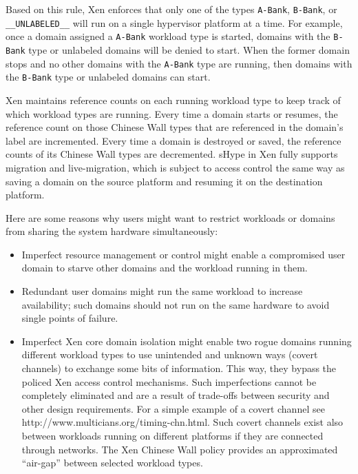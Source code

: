 \documentclass[11pt,twoside,final,openright]{report}
\begin{document}
Based on this rule, Xen enforces that only one of the types
\verb|A-Bank|, \verb|B-Bank|, or \verb|__UNLABELED__| will run
on a single hypervisor platform at a time. For example, once a domain assigned a
\verb|A-Bank| workload type is started, domains with the
\verb|B-Bank| type or unlabeled domains will be denied to start.
When the former domain stops and no other domains with the \verb|A-Bank|
type are running, then domains with the \verb|B-Bank| type or unlabeled domains
can start.

Xen maintains reference counts on each running workload type to keep
track of which workload types are running. Every time a domain starts
or resumes, the reference count on those Chinese Wall types that are
referenced in the domain's label are incremented. Every time a domain
is destroyed or saved, the reference counts of its Chinese Wall types
are decremented. sHype in Xen fully supports migration and live-migration,
which is subject to access control the same way as saving a domain on
the source platform and resuming it on the destination platform.

Here are some reasons why users might want to restrict workloads or domains
from sharing the system hardware simultaneously:

\begin{itemize}
\item Imperfect resource management or control might enable a compromised
  user domain to starve other domains and the workload running in them.
\item Redundant user domains might run the same workload to increase
  availability; such domains should not run on the same hardware to
  avoid single points of failure.
\item Imperfect Xen core domain isolation might enable two rogue
  domains running different workload types to use unintended and
  unknown ways (covert channels) to exchange some bits of information.
  This way, they bypass the policed Xen access control mechanisms.  Such
  imperfections cannot be completely eliminated and are a result of
  trade-offs between security and other design requirements. For a
  simple example of a covert channel see
  http://www.multicians.org/timing-chn.html. Such covert channels
  exist also between workloads running on different platforms if they
  are connected through networks. The Xen Chinese Wall policy provides
  an approximated ``air-gap'' between selected workload types.
\end{itemize}
\end{document}
